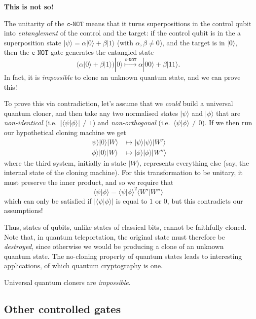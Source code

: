 \documentclass[fleqn]{article}
\newenvironment{idea}{\noindent}{\medskip}
\begin{document}
\textbf{This is not so!}

The unitarity of the \(\texttt{c-NOT}\) means that it turns superpositions in the control qubit into \emph{entanglement} of the control and the target: if the control qubit is in the a superposition state \(|\psi\rangle = \alpha|0\rangle+\beta|1\rangle\) (with \(\alpha,\beta\neq0\)), and the target is in \(|0\rangle\), then the \(\texttt{c-NOT}\) gate generates the entangled state
\[
  \big( \alpha|0\rangle+\beta|1\rangle \big) |0\rangle
  \overset{\texttt{c-NOT}}{\longmapsto}
  \alpha|00\rangle + \beta|11\rangle.
\]
In fact, it is \emph{impossible} to clone an unknown quantum state, and we can prove this!

To prove this via contradiction, let's assume that we \emph{could} build a universal quantum cloner, and then take any two normalised states \(|\psi\rangle\) and \(|\phi\rangle\) that are \emph{non-identical} (i.e.~\(|\langle\psi|\phi\rangle|\neq1\)) and \emph{non-orthogonal} (i.e.~\(\langle\psi|\phi\rangle\neq0\)).
If we then run our hypothetical cloning machine we get
\[
  \begin{aligned}
    |\psi\rangle|0\rangle|W\rangle
    &\mapsto |\psi\rangle|\psi\rangle|W'\rangle
  \\|\phi\rangle|0\rangle|W\rangle
    &\mapsto |\phi\rangle|\phi\rangle|W''\rangle
  \end{aligned}
\]
where the third system, initially in state \(|W\rangle\), represents everything else (say, the internal state of the cloning machine).
For this transformation to be unitary, it must preserve the inner product, and so we require that
\[
  \langle\psi|\phi\rangle
  = \langle\psi|\phi\rangle^2 \langle W'|W''\rangle
\]
which can only be satisfied if \(|\langle\psi|\phi\rangle|\) is equal to \(1\) or \(0\), but this contradicts our assumptions!

Thus, states of qubits, unlike states of classical bits, cannot be faithfully cloned.
Note that, in quantum teleportation, the original state must therefore be \emph{destroyed}, since otherwise we would be producing a clone of an unknown quantum state.
The no-cloning property of quantum states leads to interesting applications, of which quantum cryptography is one.

\begin{idea}

Universal quantum cloners are \emph{impossible}.

\end{idea}

\hypertarget{other-controlled-gates}{%
\subsection{Other controlled gates}\label{other-controlled-gates}}
\end{document}
